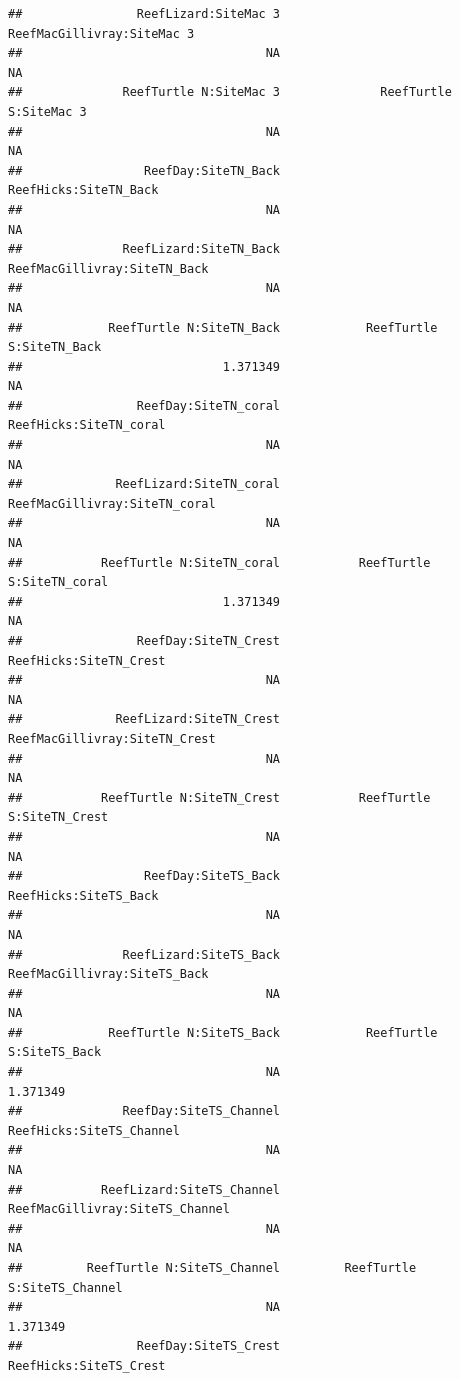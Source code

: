 \documentclass[
]{article}
\begin{document}
\begin{verbatim}
##                ReefLizard:SiteMac 3          ReefMacGillivray:SiteMac 3 
##                                  NA                                  NA 
##              ReefTurtle N:SiteMac 3              ReefTurtle S:SiteMac 3 
##                                  NA                                  NA 
##                 ReefDay:SiteTN_Back               ReefHicks:SiteTN_Back 
##                                  NA                                  NA 
##              ReefLizard:SiteTN_Back        ReefMacGillivray:SiteTN_Back 
##                                  NA                                  NA 
##            ReefTurtle N:SiteTN_Back            ReefTurtle S:SiteTN_Back 
##                            1.371349                                  NA 
##                ReefDay:SiteTN_coral              ReefHicks:SiteTN_coral 
##                                  NA                                  NA 
##             ReefLizard:SiteTN_coral       ReefMacGillivray:SiteTN_coral 
##                                  NA                                  NA 
##           ReefTurtle N:SiteTN_coral           ReefTurtle S:SiteTN_coral 
##                            1.371349                                  NA 
##                ReefDay:SiteTN_Crest              ReefHicks:SiteTN_Crest 
##                                  NA                                  NA 
##             ReefLizard:SiteTN_Crest       ReefMacGillivray:SiteTN_Crest 
##                                  NA                                  NA 
##           ReefTurtle N:SiteTN_Crest           ReefTurtle S:SiteTN_Crest 
##                                  NA                                  NA 
##                 ReefDay:SiteTS_Back               ReefHicks:SiteTS_Back 
##                                  NA                                  NA 
##              ReefLizard:SiteTS_Back        ReefMacGillivray:SiteTS_Back 
##                                  NA                                  NA 
##            ReefTurtle N:SiteTS_Back            ReefTurtle S:SiteTS_Back 
##                                  NA                            1.371349 
##              ReefDay:SiteTS_Channel            ReefHicks:SiteTS_Channel 
##                                  NA                                  NA 
##           ReefLizard:SiteTS_Channel     ReefMacGillivray:SiteTS_Channel 
##                                  NA                                  NA 
##         ReefTurtle N:SiteTS_Channel         ReefTurtle S:SiteTS_Channel 
##                                  NA                            1.371349 
##                ReefDay:SiteTS_Crest              ReefHicks:SiteTS_Crest 

\end{verbatim}
\end{document}
